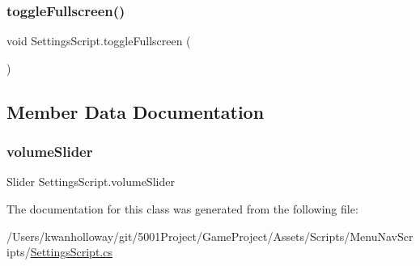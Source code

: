 \subsubsection{\texorpdfstring{toggle\+Fullscreen()}{toggleFullscreen()}}
{\footnotesize\ttfamily void Settings\+Script.\+toggle\+Fullscreen (\begin{DoxyParamCaption}{ }\end{DoxyParamCaption})}



\subsection{Member Data Documentation}
\mbox{\label{class_settings_script_ad08bdea1b11fad7c975f6ec3449c575a}} 
\subsubsection{\texorpdfstring{volume\+Slider}{volumeSlider}}
{\footnotesize\ttfamily Slider Settings\+Script.\+volume\+Slider}



The documentation for this class was generated from the following file\+:\begin{DoxyCompactItemize}
\item 
/\+Users/kwanholloway/git/5001\+Project/\+Game\+Project/\+Assets/\+Scripts/\+Menu\+Nav\+Scripts/\hyperlink{_settings_script_8cs}{Settings\+Script.\+cs}\end{DoxyCompactItemize}
